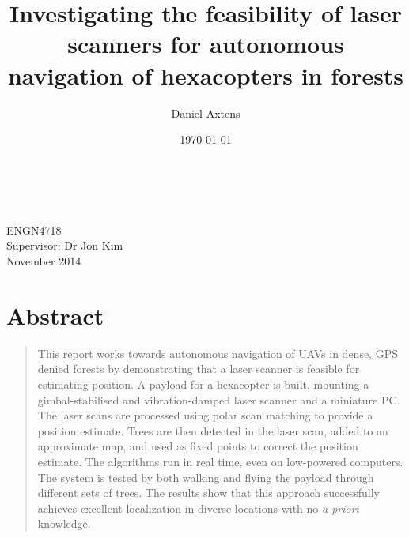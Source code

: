 \documentclass[12pt,oneside,a4paper,draft]{book}
\title{Investigating the feasibility of laser scanners for autonomous
  navigation of hexacopters in forests}
\author{Daniel Axtens}
\date{\today}
\begin{document}
\pagestyle{empty}
\thispagestyle{empty}

\begin{titlepage}
  \enlargethispage{2cm}
  \begin{center}
    \makeatletter
    \Huge\textbf{\@title} \\[2.9cm]
    \huge\textbf{\@author} \\[10.5cm]
    \makeatother
    \LARGE ENGN4718\\
    Supervisor: Dr Jon Kim\\[2cm]
    November 2014
  \end{center}
\end{titlepage}


%

%

%

\cleardoublepage
\pagestyle{headings}
%

\section*{\centering Abstract}
\label{sec:abstract}

\begin{quote}
  This report works towards autonomous navigation of \glspl{UAV} in dense,
  GPS denied forests by demonstrating that a laser scanner is feasible
  for estimating position. A payload for a hexacopter is built,
  mounting a gimbal-stabilised and vibration-damped laser scanner and
  a miniature PC. The laser scans are processed using polar scan
  matching to provide a position estimate. Trees are then detected in
  the laser scan, added to an approximate map, and used as fixed
  points to correct the position estimate. The algorithms run in real
  time, even on low-powered computers. The system is tested by both
  walking and flying the payload through different sets of trees. The
  results show that this approach successfully achieves excellent
  localization in diverse locations with no \emph{a priori}
  knowledge.
\end{quote}
\end{document}
